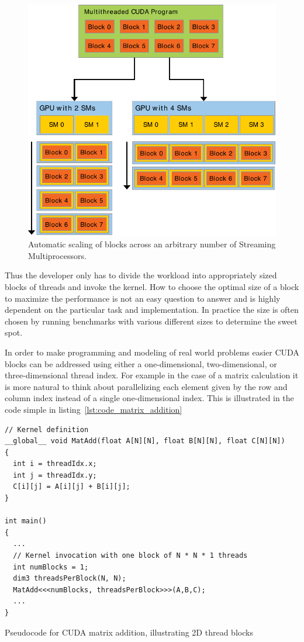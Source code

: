 \documentclass[a4paper,11pt]{kth-mag}
\begin{document}
\begin{figure}[!htbp]
  \centering
  \includegraphics[width=\textwidth]{img/automatic_scaling.pdf}
  \caption{Automatic scaling of blocks across an arbitrary number of Streaming Multiprocessors.}
  \label{fig:automatic_scaling}
\end{figure}

Thus the developer only has to divide the workload into appropriately sized blocks of threads and invoke the kernel. How to choose the optimal size of a block to maximize the performance is not an easy question to answer and is highly dependent on the particular task and implementation. In practice the size is often chosen by running benchmarks with various different sizes to determine the sweet spot.

In order to make programming and modeling of real world problems easier CUDA blocks can be addressed using either a one-dimensional, two-dimensional, or three-dimensional thread index. For example in the case of a matrix calculation it is more natural to think about parallelizing each element given by the row and column index instead of a single one-dimensional index. This is illustrated in the code simple in listing~\ref{lst:code_matrix_addition}

\begin{listing}[!htbp]
  \centering
  \begin{verbatim}
// Kernel definition
__global__ void MatAdd(float A[N][N], float B[N][N], float C[N][N])
{
  int i = threadIdx.x;
  int j = threadIdx.y;
  C[i][j] = A[i][j] + B[i][j];
}

int main()
{
  ...
  // Kernel invocation with one block of N * N * 1 threads
  int numBlocks = 1;
  dim3 threadsPerBlock(N, N);
  MatAdd<<<numBlocks, threadsPerBlock>>>(A,B,C);
  ...
}
  \end{verbatim}
  \caption{Pseudocode for CUDA matrix addition, illustrating 2D thread blocks}
  \label{lst:code_matrix_addition}
\end{listing}
\end{document}
